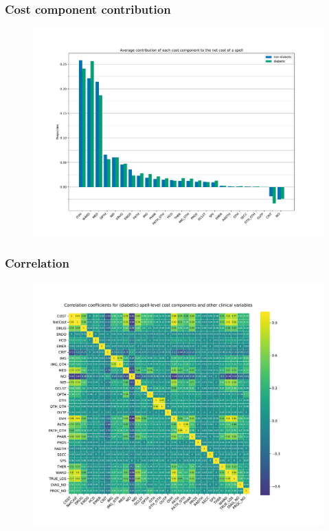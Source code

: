 \documentclass{beamer}
\begin{document}
\begin{frame}
    \frametitle{Cost component contribution}

    \begin{figure}
        \includegraphics[width=\linewidth]{./img/diabetic_cost_contribution.pdf}
    \end{figure}
\end{frame}

\begin{frame}
    \frametitle{Correlation}

    \vspace{-15pt}
    \begin{figure}
        \includegraphics[width=\linewidth]{./img/diabetic_corr_heatmap.pdf}
    \end{figure}
\end{frame}
\end{document}
